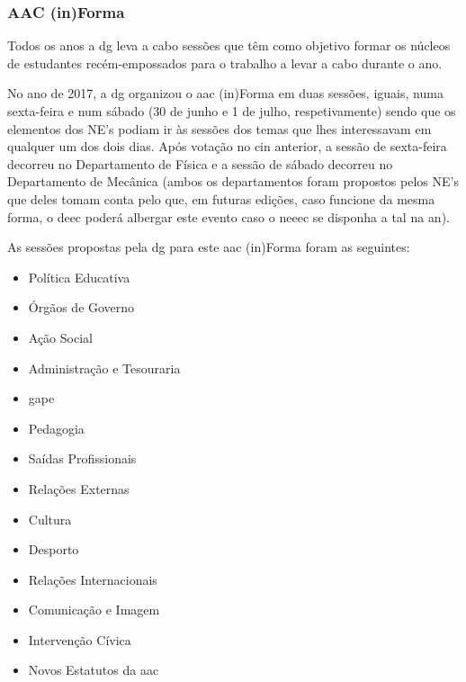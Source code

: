 
\subsubsection{AAC (in)Forma}

Todos os anos a \acrshort{dg} leva a cabo sessões que têm como objetivo formar os núcleos de estudantes recém-empossados para o trabalho a levar a cabo durante o ano.

No ano de 2017, a \acrshort{dg} organizou o \acrshort{aac} (in)Forma em duas sessões, iguais, numa sexta-feira e num sábado (30 de junho e 1 de julho, respetivamente) sendo que os elementos dos NE’s podiam ir às sessões dos temas que lhes interessavam em qualquer um dos dois dias. Após votação no \acrshort{cin} anterior, a sessão de sexta-feira decorreu no Departamento de Física e a sessão de sábado decorreu no Departamento de Mecânica (ambos os departamentos foram propostos pelos NE’s que deles tomam conta pelo que, em futuras edições, caso funcione da mesma forma, o \acrshort{deec} poderá albergar este evento caso o \acrshort{neeec} se disponha a tal na \acrshort{an}).

As sessões propostas pela \acrshort{dg} para este \acrshort{aac} (in)Forma foram as seguintes:
\begin{itemize}
\item Política Educativa
\item Órgãos de Governo
\item Ação Social
\item Administração e Tesouraria
\item \acrshort{gape}
\item Pedagogia
\item Saídas Profissionais
\item Relações Externas
\item Cultura
\item Desporto
\item Relações Internacionais
\item Comunicação e Imagem
\item Intervenção Cívica
\item Novos Estatutos da \acrshort{aac}
\end{itemize}

